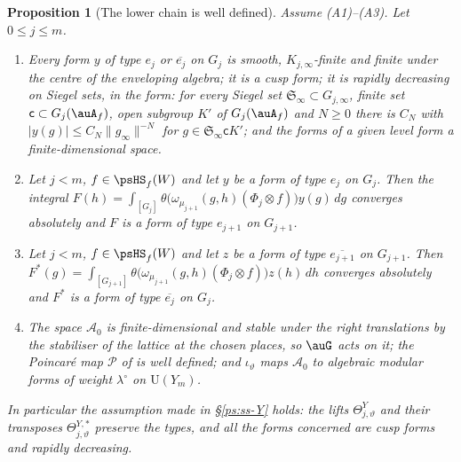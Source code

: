 \documentclass[10pt]{amsart}
\newtheorem{proposition}[theorem]{Proposition}
\theoremstyle{definition}
\theoremstyle{remark}
\providecommand{\auAz}{\mathcal A_0}
\providecommand{\auP}{\mathcal P}
\providecommand{\auU}{\mathrm U}
\begin{document}
\begin{proposition}[The lower chain is well defined]\label{pz:types}
Assume {\rm(A1)--(A3)}. Let $0\le j\le m$.
\begin{enumerate}
\item[(a)] Every form $y$ of type $e_j$ or $\overline{e_j}$ on $G_j$ is smooth, $K_{j,\infty}$-finite
and finite under the centre of the enveloping algebra; it is a cusp form; it is rapidly
decreasing on Siegel sets, in the form: for every Siegel set $\mathfrak S_\infty\subset G_{j,\infty}$, finite set $\mathsf c\subset G_j(\auA_f)$, open subgroup $K'$ of $G_j(\auA_f)$ and $N\ge0$ there is $C_N$ with $|y(g)|\le C_N\|g_\infty\|^{-N}$ for $g\in\mathfrak S_\infty\mathsf cK'$; and the forms of a given level form a finite-dimensional space.
\item[(b)] Let $j<m$, $f\in\psHS_f(W)$ and let $y$ be a form of type $e_j$ on $G_j$. Then the
integral $F(h)=\int_{[G_j]}\theta\bigl(\omega_{\mu_{j+1}}(g,h)(\Phi_j\otimes f)\bigr)y(g)\,dg$ converges
absolutely and $F$ is a form of type $e_{j+1}$ on $G_{j+1}$.
\item[(c)] Let $j<m$, $f\in\psHS_f(W)$ and let $z$ be a form of type $\overline{e_{j+1}}$ on
$G_{j+1}$. Then $F^*(g)=\int_{[G_{j+1}]}\theta\bigl(\omega_{\mu_{j+1}}(g,h)(\Phi_j\otimes f)\bigr)z(h)
\,dh$ converges absolutely and $F^*$ is a form of type $\overline{e_j}$ on $G_j$.
\item[(d)] The space $\auAz$ is finite-dimensional and stable under the right translations by
the stabiliser of the lattice at the chosen places, so $\auG$ acts on it; the Poincar\'e map
$\auP$ of {\cite[\S14.3]{P46}} is well defined; and $\iota_\vartheta$ maps $\auAz$ to algebraic
modular forms of weight $\lambda^\circ$ on $\auU(Y_m)$.
\end{enumerate}
In particular the assumption made in \S\ref{ps:ss-Y} holds: the lifts $\Theta^Y_{j,\vartheta}$ and
their transposes $\Theta^{Y,*}_{j,\vartheta}$ preserve the types, and all the forms concerned are
cusp forms and rapidly decreasing.
\end{proposition}
\end{document}
